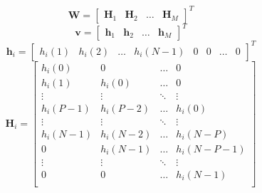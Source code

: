 \documentclass[finnish,12pt]{article}
\begin{document}
\begin{equation}
\textbf{W} = \begin{bmatrix}
\textbf{H}_1 & \textbf{H}_2 & \hdots & \textbf{H}_M
\end{bmatrix}^T
\end{equation}
\begin{equation}
\textbf{v} = \begin{bmatrix}
\textbf{h}_1 & \textbf{h}_2 & \hdots & \textbf{h}_M
\end{bmatrix}^T
\end{equation}
\begin{equation}
\textbf{h}_i = \begin{bmatrix}
h_i(1) & h_i(2) & \hdots & h_i(N-1) & 0 & 0 & \hdots & 0
\end{bmatrix}^T
\end{equation}
\begin{equation}
\textbf{H}_i = \begin{bmatrix}
h_i(0) & 0 & \hdots & 0 \\
h_i(1) & h_i(0) & \hdots & 0 \\
\vdots & \vdots & \ddots & \vdots \\
h_i(P-1) & h_i(P-2) & \hdots & h_i(0) \\
\vdots & \vdots & \ddots & \vdots \\
h_i(N-1) & h_i(N-2) & \hdots & h_i(N-P) \\
0 & h_i(N-1) & \hdots & h_i(N-P-1) \\
\vdots & \vdots & \ddots & \vdots \\
0 & 0 & \hdots & h_i(N-1) \\
\end{bmatrix}
\end{equation}
\end{document}
